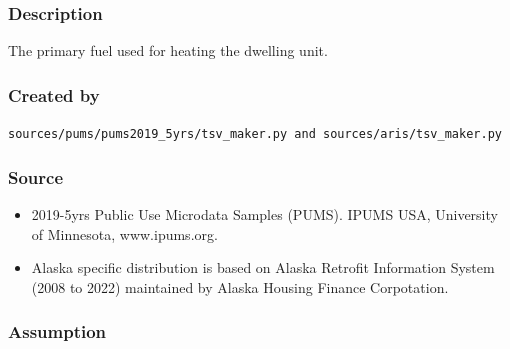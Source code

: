 \subsubsection{Description}\label{description-86}

The primary fuel used for heating the dwelling unit.

\subsubsection{Created by}\label{created-by-86}

\texttt{sources/pums/pums2019\_5yrs/tsv\_maker.py\ and\ sources/aris/tsv\_maker.py}

\subsubsection{Source}\label{source-85}

\begin{itemize}
 
\item
  2019-5yrs Public Use Microdata Samples (PUMS). IPUMS USA, University
  of Minnesota, www.ipums.org.
\item
  Alaska specific distribution is based on Alaska Retrofit Information
  System (2008 to 2022) maintained by Alaska Housing Finance
  Corpotation.
\end{itemize}

\subsubsection{Assumption}\label{assumption-50}

